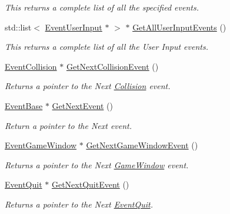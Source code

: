 \begin{DoxyCompactItemize}
\begin{DoxyCompactList}\small\item\em This returns a complete list of all the specified events. \item\end{DoxyCompactList}\item 
std::list$<$ \hyperlink{classMezzanine_1_1EventUserInput}{EventUserInput} $\ast$ $>$ $\ast$ \hyperlink{classMezzanine_1_1EventManager_a50abe233b2f932105d0f33cd38badb26}{GetAllUserInputEvents} ()
\begin{DoxyCompactList}\small\item\em This returns a complete list of all the User Input events. \item\end{DoxyCompactList}\item 
\hyperlink{classMezzanine_1_1EventCollision}{EventCollision} $\ast$ \hyperlink{classMezzanine_1_1EventManager_adfba3feeb1e4174909db98412f894a3b}{GetNextCollisionEvent} ()
\begin{DoxyCompactList}\small\item\em Returns a pointer to the Next \hyperlink{classMezzanine_1_1Collision}{Collision} event. \item\end{DoxyCompactList}\item 
\hyperlink{classMezzanine_1_1EventBase}{EventBase} $\ast$ \hyperlink{classMezzanine_1_1EventManager_aea5b5a53dabead276cee5f94152bd9c2}{GetNextEvent} ()
\begin{DoxyCompactList}\small\item\em Return a pointer to the Next event. \item\end{DoxyCompactList}\item 
\hyperlink{classMezzanine_1_1EventGameWindow}{EventGameWindow} $\ast$ \hyperlink{classMezzanine_1_1EventManager_a60f9633517b214128a359c4ef92bafb7}{GetNextGameWindowEvent} ()
\begin{DoxyCompactList}\small\item\em Returns a pointer to the Next \hyperlink{classMezzanine_1_1GameWindow}{GameWindow} event. \item\end{DoxyCompactList}\item 
\hyperlink{classMezzanine_1_1EventQuit}{EventQuit} $\ast$ \hyperlink{classMezzanine_1_1EventManager_afd185415d7a139df30eb35309e8dee45}{GetNextQuitEvent} ()
\begin{DoxyCompactList}\small\item\em Returns a pointer to the Next \hyperlink{classMezzanine_1_1EventQuit}{EventQuit}. \item\end{DoxyCompactList}\item 

\end{DoxyCompactItemize}
